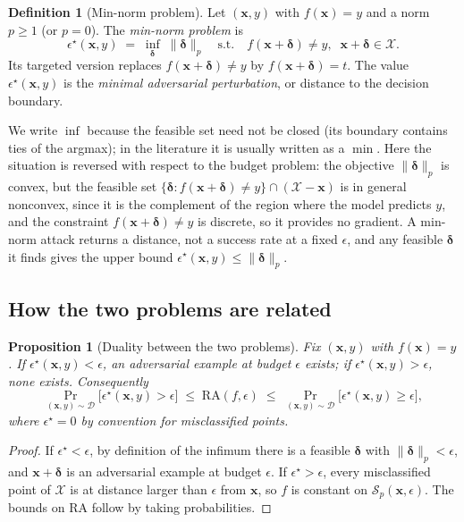 \documentclass[10pt,a4paper]{extarticle}
\newtheorem{proposition}[theorem]{Proposition}
\theoremstyle{definition}
\newtheorem{definition}{Definition}[section]
\newcommand{\X}{\mathcal{X}}
\newcommand{\D}{\mathcal{D}}
\newcommand{\x}{\mathbf{x}}
\newcommand{\bdelta}{\boldsymbol{\delta}}
\begin{document}
\begin{definition}[Min-norm problem]\label{def:minnorm}
Let \((\x,y)\) with \(f(\x)=y\) and a norm \(p\ge1\) (or \(p=0\)). The \emph{min-norm problem} is
\begin{equation}\label{eq:minnorm}
\epsilon^\star(\x,y)\;=\;\inf_{\bdelta}\;\|\bdelta\|_p
\quad\text{s.t.}\quad f(\x+\bdelta)\neq y,\;\; \x+\bdelta\in\X .
\end{equation}
Its targeted version replaces \(f(\x+\bdelta)\neq y\) by \(f(\x+\bdelta)=t\). The value \(\epsilon^\star(\x,y)\) is the \emph{minimal adversarial perturbation}, or distance to the decision boundary.
\end{definition}

We write \(\inf\) because the feasible set need not be closed (its boundary contains ties of the argmax); in the literature it is usually written as a \(\min\). Here the situation is reversed with respect to the budget problem: the objective \(\|\bdelta\|_p\) is convex, but the feasible set \(\{\bdelta: f(\x+\bdelta)\neq y\}\cap(\X-\x)\) is in general nonconvex, since it is the complement of the region where the model predicts \(y\), and the constraint \(f(\x+\bdelta)\neq y\) is discrete, so it provides no gradient. A min-norm attack returns a distance, not a success rate at a fixed \(\epsilon\), and any feasible \(\bdelta\) it finds gives the upper bound \(\epsilon^\star(\x,y)\le\|\bdelta\|_p\).

\subsection{How the two problems are related}

\begin{proposition}[Duality between the two problems]\label{prop:duality}
Fix \((\x,y)\) with \(f(\x)=y\). If \(\epsilon^\star(\x,y)<\epsilon\), an adversarial example at budget \(\epsilon\) exists; if \(\epsilon^\star(\x,y)>\epsilon\), none exists. Consequently
\[
\Pr_{(\x,y)\sim\D}\big[\epsilon^\star(\x,y)>\epsilon\big]\;\le\;\mathrm{RA}(f,\epsilon)\;\le\;\Pr_{(\x,y)\sim\D}\big[\epsilon^\star(\x,y)\ge\epsilon\big],
\]
where \(\epsilon^\star=0\) by convention for misclassified points.
\end{proposition}

\begin{proof}
If \(\epsilon^\star<\epsilon\), by definition of the infimum there is a feasible \(\bdelta\) with \(\|\bdelta\|_p<\epsilon\), and \(\x+\bdelta\) is an adversarial example at budget \(\epsilon\). If \(\epsilon^\star>\epsilon\), every misclassified point of \(\X\) is at distance larger than \(\epsilon\) from \(\x\), so \(f\) is constant on \(\mathcal{S}_p(\x,\epsilon)\). The bounds on \(\mathrm{RA}\) follow by taking probabilities.
\end{proof}
\end{document}
